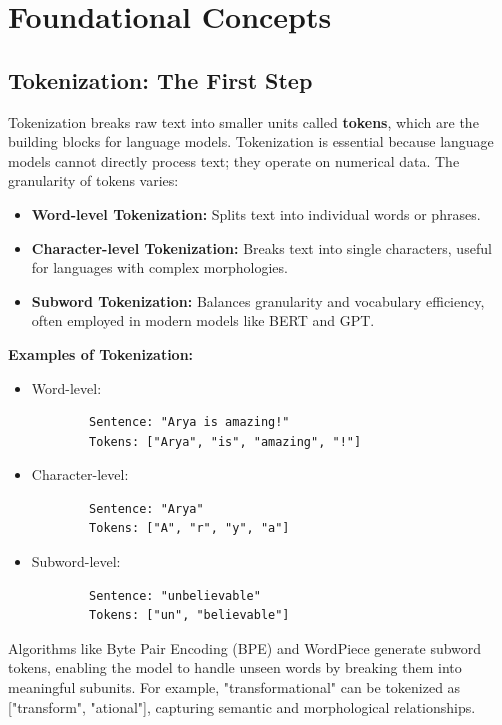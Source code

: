 \section{Foundational Concepts}
\subsection{Tokenization: The First Step}
    \large Tokenization breaks raw text into smaller units called \textbf{tokens}, which are the building blocks for language models. Tokenization is essential because language models cannot directly process text; they operate on numerical data. The granularity of tokens varies:
    \begin{itemize}
        \item \textbf{Word-level Tokenization:} Splits text into individual words or phrases.
        \item \textbf{Character-level Tokenization:} Breaks text into single characters, useful for languages with complex morphologies.
        \item \textbf{Subword Tokenization:} Balances granularity and vocabulary efficiency, often employed in modern models like BERT and GPT.
    \end{itemize}

\textbf{Examples of Tokenization:}
    \begin{itemize}
        \item Word-level:
        \begin{verbatim}
        Sentence: "Arya is amazing!"
        Tokens: ["Arya", "is", "amazing", "!"]
        \end{verbatim}
        \item Character-level:
        \begin{verbatim}
        Sentence: "Arya"
        Tokens: ["A", "r", "y", "a"]
        \end{verbatim}
        \item Subword-level:
        \begin{verbatim}
        Sentence: "unbelievable"
        Tokens: ["un", "believable"]
        \end{verbatim}
    \end{itemize}

    Algorithms like Byte Pair Encoding (BPE) and WordPiece generate subword tokens, enabling the model to handle unseen words by breaking them into meaningful subunits. For example, "transformational" can be tokenized as ["transform", "ational"], capturing semantic and morphological relationships.

